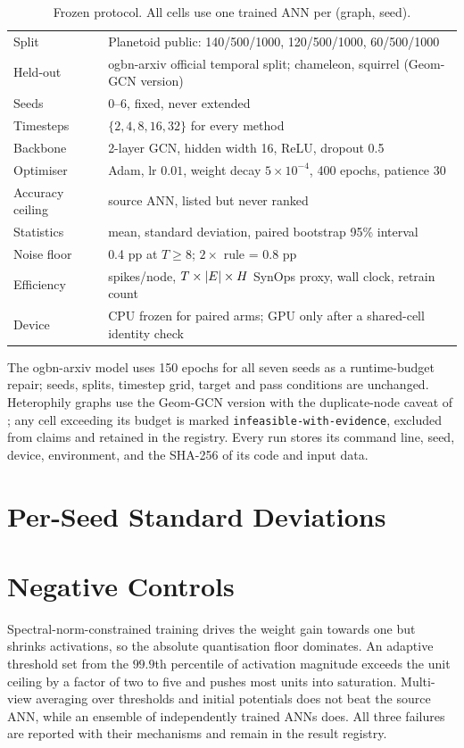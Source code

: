 \begin{table}[h]
\centering\small
\caption{Frozen protocol. All cells use one trained ANN per (graph, seed).}
\label{tab:protocol}
\begin{tabular}{ll}
\toprule
Split & Planetoid public: 140/500/1000, 120/500/1000, 60/500/1000 \\
Held-out & ogbn-arxiv official temporal split; chameleon, squirrel (Geom-GCN version) \\
Seeds & 0--6, fixed, never extended \\
Timesteps & $\{2,4,8,16,32\}$ for every method \\
Backbone & 2-layer GCN, hidden width 16, ReLU, dropout 0.5 \\
Optimiser & Adam, lr $0.01$, weight decay $5\times10^{-4}$, 400 epochs, patience 30 \\
Accuracy ceiling & source ANN, listed but never ranked \\
Statistics & mean, standard deviation, paired bootstrap 95\% interval \\
Noise floor & 0.4 pp at $T\ge8$; $2\times$ rule = 0.8 pp \\
Efficiency & spikes/node, $T\times|E|\times H$ SynOps proxy, wall clock, retrain count \\
Device & CPU frozen for paired arms; GPU only after a shared-cell identity check \\
\bottomrule
\end{tabular}
\end{table}

The ogbn-arxiv model uses 150 epochs for all seven seeds as a runtime-budget repair; seeds,
splits, timestep grid, target and pass conditions are unchanged. Heterophily graphs use the
Geom-GCN version with the duplicate-node caveat of \cite{heterophily2023}; any cell exceeding its
budget is marked \texttt{infeasible-with-evidence}, excluded from claims and retained in the
registry. Every run stores its command line, seed, device, environment, and the SHA-256 of its
code and input data.

\section{Per-Seed Standard Deviations}
\label{app:std}


\section{Negative Controls}
\label{app:negative}
Spectral-norm-constrained training drives the weight gain towards one but shrinks activations,
so the absolute quantisation floor dominates. An adaptive threshold set from the $99.9$th
percentile of activation magnitude exceeds the unit ceiling by a factor of two to five and pushes
most units into saturation. Multi-view averaging over thresholds and initial potentials does not
beat the source ANN, while an ensemble of independently trained ANNs does. All three failures are
reported with their mechanisms and remain in the result registry.
